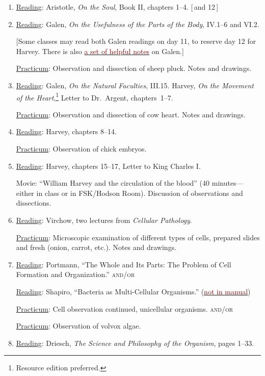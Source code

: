 \documentclass{article}
\newcommand{\rd}{\uline{Reading}}
\newcommand{\pc}{\uline{Practicum}}
\begin{document}
\begin{enumerate}
\pc: Continue discussions of the practicum.

\item \rd:\label{soul} Aristotle, \emph{On the Soul}, Book II, chapters 1--4. [\,and 12\,]

\item \rd: Galen, \emph{On the Usefulness of the Parts of the Body}, IV.1--6 and VI.2.

 [Some classes may read
both Galen readings on day 11, to reserve day 12 for Harvey. There is also \hyperlink{Galen.1}{\textcolor{Maroon}{a set of helpful notes}} on Galen.]

\pc: Observation and dissection of sheep pluck. Notes and drawings.

\item \rd: Galen, \emph{On the Natural Faculties}, III.15.
	Harvey, \emph{On the Movement of the Heart},\footnote{Resource edition preferred.} Letter to Dr.\
Argent, chapters\ 1--7.

\pc: Observation and dissection of cow heart. Notes and drawings.

\item \rd: Harvey, chapters 8--14.

	\pc: Observation of chick embryos.
\item \rd: Harvey, chapters 15--17, Letter to King Charles I.

	Movie: ``William Harvey and the circulation of the blood'' (40 minutes---either in class or in FSK/Hodson Room). Discussion of observations and dissections.

\item \rd: Virchow, two lectures from \emph{Cellular Pathology}.

	\pc: Microscopic examination of different types of cells, prepared slides and fresh (onion, carrot, etc.). Notes and drawings.
\item \rd: Portmann, ``The Whole and Its Parts: The Problem of Cell Formation and Organization.'' \textsc{and/or}

\rd: Shapiro, ``Bacteria as Multi-Cellular Organisms.'' (\hyperlink{Shapiro.1.pdf}{\textcolor{Maroon}{not in manual}})

	\pc: Cell observation continued, unicellular organisms. \textsc{and/or} 
	 
	\pc: Observation of volvox algae.
	
\item \rd: Driesch, \emph{The Science and Philosophy of the Organism}, pages 1--33.


\end{enumerate}
\end{document}
